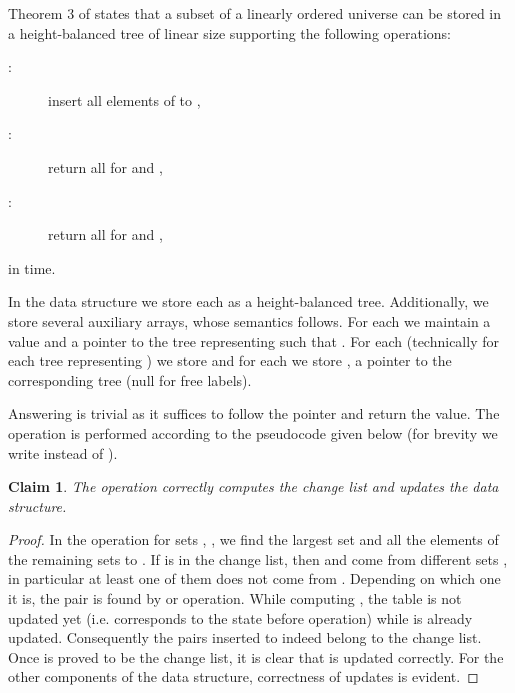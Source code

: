 \documentclass{article}
\newenvironment{myfunction}[2][htbp]
  {\setlength{\algomargin}{.2cm}
    \begin{center}
    \begin{minipage}{#2}
    \begin{function}[#1]
    \small
     \let\Par=\par
       \def\par{\endgraf\vspace{.1cm}}
           \SetKw{To}{to}\SetKw{Downto}{downto}\SetKw{Or}{or}\SetKwFor{Algo}{Function}{}{}\vspace{.15cm}}
   {\let\par=\Par\end{function}\end{minipage}\end{center}}
\theoremstyle{theorem}
\newtheorem{claim}[theorem]{Claim}
\theoremstyle{definition}
\begin{document}
  Theorem 3 of \cite{DBLP:conf/cpm/BrodalP00} states that
  a subset  of a linearly ordered universe can be stored in a height-balanced
  tree of linear size supporting the following operations:
  \begin{description}
    \item[\quad :] insert all elements of  to ,
    \item[\quad :] return all  for  and ,
    \item[\quad :] return all  for  and ,
  \end{description}
  in  time.

  \smallskip

  In the data structure we store each  as a height-balanced tree.
  Additionally, we store several auxiliary arrays, whose semantics follows.
  For each  we maintain a value 
  and a pointer  to the tree representing  such that .
  For each  (technically for each tree representing ) we
  store  and for each  we store , a pointer to the
  corresponding tree (null for free labels).

  Answering  is trivial as it suffices to follow the 
  pointer and return the  value.
  The  operation is performed according
  to the pseudocode given below (for brevity we write  instead of
  ).

  \begin{claim}
    The  operation correctly computes the change list and updates the
    data structure.
  \end{claim}
  \begin{proof}
    In the  operation for sets , , we find the largest set 
    and  all the elements of the remaining sets to .
    If  is in the change list, then  and  come from
    different sets , in particular at least one of them does not come from
    . Depending on which one it is, the pair  is found by
     or  operation.
    While computing , the table  is not updated yet
    (i.e. corresponds to the state before  operation) while  is already
    updated. Consequently the pairs inserted to  indeed belong to the change
    list. 
    Once  is proved to be the change list, it is clear that  is
    updated correctly.  For the other components of the data structure,
    correctness of updates is evident.
    
  \end{proof}

  \begin{myfunction}[H]{10.8 cm}
  \Algo{}{
      \;
      \;
     \ForEach{}{
      \lForEach{}{}\;
      \;
     }
     \;
     \ForEach{}{\ForEach{}{
      \lIf{}{}\;
     }
     \ForEach{}{
      \lIf{}{}\;
      }
      \;
     }
     \;
     ; \;
     \lForEach{}{}
     \Return{}\;
  }
  \end{myfunction}
  
\end{document}
